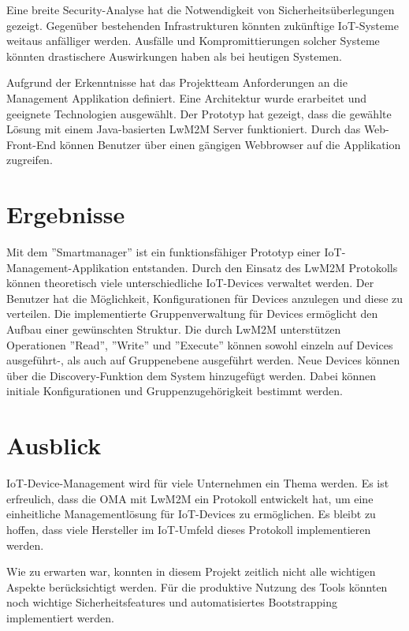 Eine breite Security-Analyse hat die Notwendigkeit von Sicherheitsüberlegungen gezeigt. Gegenüber bestehenden Infrastrukturen könnten zukünftige IoT-Systeme weitaus anfälliger werden. Ausfälle und Kompromittierungen solcher Systeme könnten drastischere Auswirkungen haben als bei heutigen Systemen. 

Aufgrund der Erkenntnisse hat das Projektteam Anforderungen an die Management Applikation definiert. Eine Architektur wurde erarbeitet und geeignete Technologien ausgewählt. Der Prototyp hat gezeigt, dass die gewählte Lösung mit einem Java-basierten LwM2M Server funktioniert. Durch das Web-Front-End können Benutzer über einen gängigen Webbrowser auf die Applikation zugreifen.
\section*{Ergebnisse}
Mit dem ''Smartmanager'' ist ein funktionsfähiger Prototyp einer IoT-Management-Applikation entstanden. Durch den Einsatz des LwM2M Protokolls können theoretisch viele unterschiedliche IoT-Devices verwaltet werden. Der Benutzer hat die Möglichkeit, Konfigurationen für Devices anzulegen und diese zu verteilen. Die implementierte Gruppenverwaltung für Devices ermöglicht den Aufbau einer gewünschten Struktur. Die durch LwM2M unterstützen Operationen ''Read'', ''Write'' und ''Execute'' können sowohl einzeln auf Devices ausgeführt-, als auch auf Gruppenebene ausgeführt werden. Neue Devices können über die Discovery-Funktion dem System hinzugefügt werden. Dabei können initiale Konfigurationen und Gruppenzugehörigkeit bestimmt werden.
\section*{Ausblick}
IoT-Device-Management wird für viele Unternehmen ein Thema werden. Es ist erfreulich, dass die OMA mit LwM2M ein Protokoll entwickelt hat, um eine einheitliche Managementlösung für IoT-Devices zu ermöglichen. Es bleibt zu hoffen, dass viele Hersteller im IoT-Umfeld dieses Protokoll implementieren werden.

Wie zu erwarten war, konnten in diesem Projekt zeitlich nicht alle wichtigen Aspekte berücksichtigt werden. Für die produktive Nutzung des Tools könnten noch wichtige Sicherheitsfeatures und automatisiertes Bootstrapping implementiert werden.
